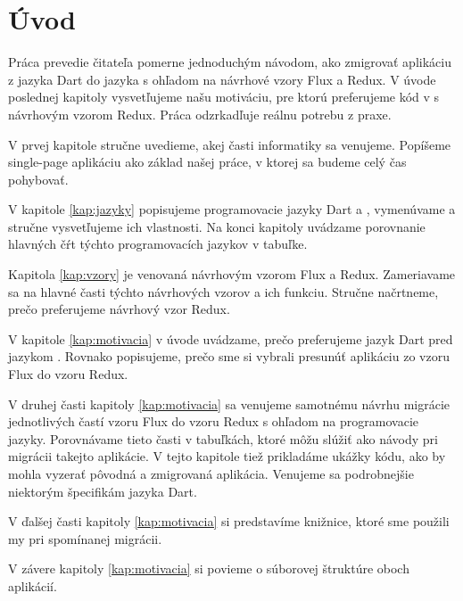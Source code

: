 \chapter*{Úvod} %

Práca prevedie čitateľa pomerne jednoduchým návodom, ako zmigrovať aplikáciu z jazyka Dart do jazyka \JS{} s ohľadom na návrhové vzory Flux a Redux. V úvode poslednej kapitoly vysvetľujeme našu motiváciu, pre ktorú preferujeme kód v \JS{} s návrhovým vzorom Redux. Práca odzrkadľuje reálnu potrebu z praxe.

V prvej kapitole stručne uvedieme, akej časti informatiky sa venujeme. Popíšeme single-page aplikáciu ako základ našej práce, v ktorej sa budeme celý čas pohybovať.

V kapitole \ref{kap:jazyky} popisujeme programovacie jazyky Dart a \JS{}, vymenúvame a stručne vysvetľujeme ich vlastnosti. Na konci kapitoly uvádzame porovnanie hlavných čŕt týchto programovacích jazykov v tabuľke.

Kapitola \ref{kap:vzory} je venovaná návrhovým vzorom Flux a Redux. Zameriavame sa na hlavné časti týchto návrhových vzorov a ich funkciu. Stručne načrtneme, prečo preferujeme návrhový vzor Redux.

V kapitole \ref{kap:motivacia} v úvode uvádzame, prečo preferujeme jazyk Dart pred jazykom \JS{}. Rovnako popisujeme, prečo sme si vybrali presunúť aplikáciu zo vzoru Flux do vzoru Redux.

V druhej časti kapitoly \ref{kap:motivacia} sa venujeme samotnému návrhu migrácie jednotlivých častí vzoru Flux do vzoru Redux s ohľadom na programovacie jazyky. Porovnávame tieto časti v tabuľkách, ktoré môžu slúžiť ako návody pri migrácii takejto aplikácie. V tejto kapitole tiež prikladáme ukážky kódu, ako by mohla vyzerať pôvodná a zmigrovaná aplikácia. Venujeme sa podrobnejšie niektorým špecifikám jazyka Dart.

V ďalšej časti kapitoly \ref{kap:motivacia} si predstavíme knižnice, ktoré sme použili my pri spomínanej migrácii.

V závere kapitoly \ref{kap:motivacia} si povieme o súborovej štruktúre oboch aplikácií.
